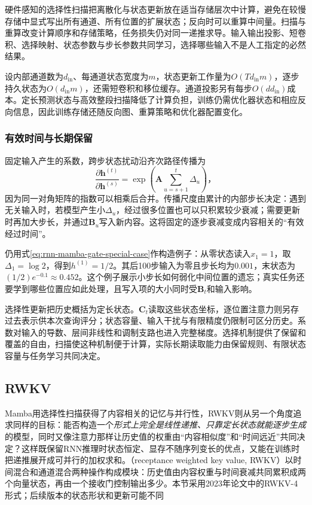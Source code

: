 硬件感知的选择性扫描把离散化与状态更新放在适当存储层次中计算，避免在较慢存储中显式写出所有通道、所有位置的扩展状态；反向时可以重算中间量。扫描与重算改变计算顺序和存储策略，任务损失仍对同一递推求导。输入输出投影、短卷积、选择映射、状态参数与步长参数共同学习，选择哪些输入不是人工指定的必然结果。

设内部通道数为$d_{\mathrm{in}}$、每通道状态宽度为$m$，状态更新工作量为$O(Td_{\mathrm{in}}m)$，逐步持久状态为$O(d_{\mathrm{in}}m)$，还需短卷积和移位缓存。通道投影另有每步$O(dd_{\mathrm{in}})$成本。定长预测状态与高效整段扫描降低了计算负担，训练仍需优化器状态和相应反向信息，因此训练存储还随反向图、重算策略和优化器配置变化。

\subsubsection{有效时间与长期保留}
\label{sec:rnn-mamba-long-memory}

固定输入产生的系数，跨步状态扰动沿齐次路径传播为
\begin{equation}
  \frac{\partial\bm h^{(t)}}{\partial\bm h^{(s)}}
    =\exp\!\left(\bm A\sum_{u=s+1}^{t}\Delta_u\right)\text{，}
  \label{eq:rnn-mamba-memory-product}
\end{equation}
因为同一对角矩阵的指数可以相乘后合并。传播尺度由累计的内部步长决定：遇到无关输入时，若模型产生小$\Delta_u$，经过很多位置也可以只积累较少衰减；需要更新时再加大步长，并通过$\bm B_u$写入新内容。这将固定的逐步衰减变成内容相关的“有效经过时间”。

仍用式\eqref{eq:rnn-mamba-gate-special-case}作构造例子：从零状态读入$x_1=1$，取$\Delta_1=\log2$，得到$h^{(1)}=1/2$。其后100步输入为零且步长均为$0.001$，末状态为$(1/2)e^{-0.1}\approx0.452$。这个例子展示小步长如何弱化中间位置的遗忘；真实任务还要学到哪些位置应如此处理，且写入项的大小同时受$\bm B_t$和输入影响。

选择性更新把历史概括为定长状态。$\bm C_t$读取这些状态坐标，逐位置注意力则另存过去表示供本次查询评分；状态容量、输入干扰与有限精度仍限制可区分历史。系数对输入的导数、层间非线性和调制支路也进入完整梯度。选择机制提供了保留和覆盖的自由，扫描使这种机制便于计算，实际长期读取能力由保留规则、有限状态容量与任务学习共同决定。

\Needspace{105mm}
\subsection{RWKV}
\label{sec:rnn-rwkv}

Mamba用选择性扫描获得了内容相关的记忆与并行性，RWKV则从另一个角度追求同样的目标：能否构造一个\emph{形式上完全是线性递推、只靠定长状态就能逐步生成}的模型，同时又像注意力那样让历史值的权重由“内容相似度”和“时间远近”共同决定？这样既保留RNN推理时状态恒定、显存不随序列变长的优点，又能在训练时把递推展开成可并行的加权求和。（receptance weighted key value, RWKV）以时间混合和通道混合两种操作构成模块：历史值由内容权重与时间衰减共同累积成两个向量状态，再由一个接收门控制输出多少。本节采用2023年论文中的RWKV-4形式；后续版本的状态形状和更新可能不同

